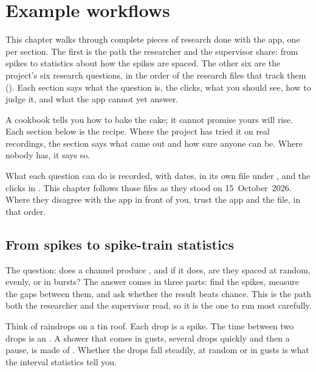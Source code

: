\chapter{Example workflows}\label{ch:workflows}
This chapter walks through complete pieces of research done with the app, one per section.
The first is the path the researcher and the supervisor share: from spikes to statistics
about how the spikes are spaced. The other six are the project's six research questions, in
the order of the research files that track them (). Each section says
what the question is, the clicks, what you should see, how to judge it, and what the app
cannot yet answer.

\begin{plainterms}
A cookbook tells you how to bake the cake; it cannot promise yours will rise. Each section
below is the recipe. Where the project has tried it on real recordings, the section says
what came out and how sure anyone can be. Where nobody has, it says so.
\end{plainterms}

\begin{watchout}
What each question can do is recorded, with dates, in its own file under
, and the clicks in . This chapter
follows those files as they stood on 15~October~2026. Where they disagree with the app in
front of you, trust the app and the file, in that order.
\end{watchout}

\section{From spikes to spike-train statistics}\label{sec:workflows-spikes}
The question: does a channel produce , and if it does, are they spaced
at random, evenly, or in bursts? The answer comes in three parts: find the spikes, measure the
gaps between them, and ask whether the result beats chance. This is the path both the
researcher and the supervisor read, so it is the one to run most carefully.

\begin{plainterms}
Think of raindrops on a tin roof. Each drop is a spike. The time between two drops is an
. A shower that comes in gusts, several drops
quickly and then a pause, is made of . Whether the drops fall
steadily, at random or in gusts is what the interval statistics tell you.
\end{plainterms}

